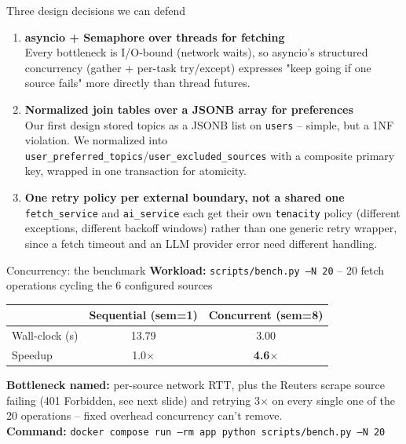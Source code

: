 \documentclass[aspectratio=169,11pt]{beamer}
\begin{document}
\begin{frame}{Three design decisions we can defend}
  \begin{enumerate}\setlength\itemsep{0.6em}
    \item \textbf{asyncio + Semaphore over threads for fetching}\\
      Every bottleneck is I/O-bound (network waits), so asyncio's structured concurrency (gather + per-task try/except) expresses "keep going if one source fails" more directly than thread futures.
    \item \textbf{Normalized join tables over a JSONB array for preferences}\\
      Our first design stored topics as a JSONB list on \texttt{users} -- simple, but a 1NF violation. We normalized into \texttt{user\_preferred\_topics}/\texttt{user\_excluded\_sources} with a composite primary key, wrapped in one transaction for atomicity.
    \item \textbf{One retry policy per external boundary, not a shared one}\\
      \texttt{fetch\_service} and \texttt{ai\_service} each get their own \texttt{tenacity} policy (different exceptions, different backoff windows) rather than one generic retry wrapper, since a fetch timeout and an LLM provider error need different handling.
  \end{enumerate}

  \vspace{0.6em}
\end{frame}

\begin{frame}{Concurrency: the benchmark}
  \textbf{Workload:} \texttt{scripts/bench.py --N 20} -- 20 fetch operations cycling the 6 configured sources

  \vspace{0.4em}
  \begin{center}\small
  \begin{tabular}{lcc}
    \toprule
    & \textbf{Sequential (sem=1)} & \textbf{Concurrent (sem=8)} \\
    \midrule
    Wall-clock (s) & 13.79 & 3.00 \\
    Speedup        & 1.0$\times$ & \textbf{4.6$\times$} \\
    \bottomrule
  \end{tabular}
  \end{center}

  \vspace{0.4em}
  \textbf{Bottleneck named:} per-source network RTT, plus the Reuters scrape source failing (401 Forbidden, see next slide) and retrying 3$\times$ on every single one of the 20 operations -- fixed overhead concurrency can't remove.\\
  \textbf{Command:} \texttt{docker compose run --rm app python scripts/bench.py --N 20}
\end{frame}
\end{document}
